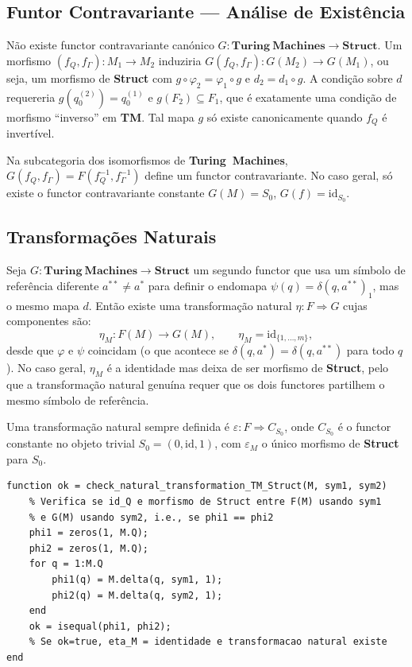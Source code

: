 \subsection{Funtor Contravariante --- Análise de Existência}

\begin{proposition}
Não existe functor contravariante canónico $G: \mathbf{Turing\ Machines} \to \mathbf{Struct}$. Um morfismo $(f_Q, f_\Gamma): M_1 \to M_2$ induziria $G(f_Q, f_\Gamma): G(M_2) \to G(M_1)$, ou seja, um morfismo de \textbf{Struct} com $g \circ \varphi_2 = \varphi_1 \circ g$ e $d_2 = d_1 \circ g$. A condição sobre $d$ requereria $g(q_0^{(2)}) = q_0^{(1)}$ e $g(F_2) \subseteq F_1$, que é exatamente uma condição de morfismo ``inverso'' em \textbf{TM}. Tal mapa $g$ só existe canonicamente quando $f_Q$ é invertível.
\end{proposition}

\begin{remark}
Na subcategoria dos isomorfismos de \textbf{Turing\ Machines}, $G(f_Q, f_\Gamma) = F(f_Q^{-1}, f_\Gamma^{-1})$ define um functor contravariante. No caso geral, só existe o functor contravariante constante $G(M) = S_0$, $G(f) = \mathrm{id}_{S_0}$.
\end{remark}

\subsection{Transformações Naturais}

Seja $G: \mathbf{Turing\ Machines} \to \mathbf{Struct}$ um segundo functor que usa um símbolo de referência diferente $a^{**} \neq a^*$ para definir o endomapa $\psi(q) = \delta(q, a^{**})_1$, mas o mesmo mapa $d$. Então existe uma transformação natural $\eta: F \Rightarrow G$ cujas componentes são:
\[
    \eta_M : F(M) \to G(M), \qquad \eta_M = \mathrm{id}_{\{1,\ldots,m\}},
\]
desde que $\varphi$ e $\psi$ coincidam (o que acontece se $\delta(q, a^*) = \delta(q, a^{**})$ para todo $q$). No caso geral, $\eta_M$ é a identidade mas deixa de ser morfismo de \textbf{Struct}, pelo que a transformação natural genuína requer que os dois functores partilhem o mesmo símbolo de referência.

Uma transformação natural sempre definida é $\varepsilon: F \Rightarrow C_{S_0}$, onde $C_{S_0}$ é o functor constante no objeto trivial $S_0 = (0, \mathrm{id}, 1)$, com $\varepsilon_M$ o único morfismo de \textbf{Struct} para $S_0$.

\begin{lstlisting}[style=matlab, caption={Transformação natural $\eta: F \Rightarrow G$ (mudança de símbolo de referência)}]
function ok = check_natural_transformation_TM_Struct(M, sym1, sym2)
    % Verifica se id_Q e morfismo de Struct entre F(M) usando sym1
    % e G(M) usando sym2, i.e., se phi1 == phi2
    phi1 = zeros(1, M.Q);
    phi2 = zeros(1, M.Q);
    for q = 1:M.Q
        phi1(q) = M.delta(q, sym1, 1);
        phi2(q) = M.delta(q, sym2, 1);
    end
    ok = isequal(phi1, phi2);
    % Se ok=true, eta_M = identidade e transformacao natural existe
end
\end{lstlisting}
